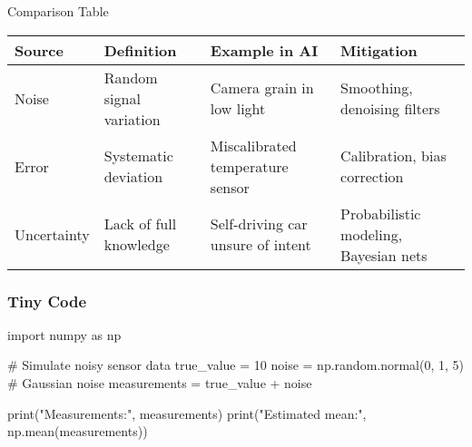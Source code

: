 \documentclass[
  letterpaper,
  DIV=11,
  numbers=noendperiod]{scrreprt}
\newenvironment{Shaded}{\begin{snugshade}}{\end{snugshade}}
\newcommand{\BuiltInTok}[1]{\textcolor[rgb]{0.00,0.23,0.31}{#1}}
\newcommand{\CommentTok}[1]{\textcolor[rgb]{0.37,0.37,0.37}{#1}}
\newcommand{\DecValTok}[1]{\textcolor[rgb]{0.68,0.00,0.00}{#1}}
\newcommand{\ImportTok}[1]{\textcolor[rgb]{0.00,0.46,0.62}{#1}}
\newcommand{\NormalTok}[1]{\textcolor[rgb]{0.00,0.23,0.31}{#1}}
\newcommand{\OperatorTok}[1]{\textcolor[rgb]{0.37,0.37,0.37}{#1}}
\newcommand{\StringTok}[1]{\textcolor[rgb]{0.13,0.47,0.30}{#1}}
\begin{document}
Comparison Table

\begin{longtable}[]{@{}
  >{\raggedright\arraybackslash}p{}
  >{\raggedright\arraybackslash}p{}
  >{\raggedright\arraybackslash}p{}
  >{\raggedright\arraybackslash}p{}@{}}
\toprule\noalign{}
\begin{minipage}[b]{\linewidth}\raggedright
Source
\end{minipage} & \begin{minipage}[b]{\linewidth}\raggedright
Definition
\end{minipage} & \begin{minipage}[b]{\linewidth}\raggedright
Example in AI
\end{minipage} & \begin{minipage}[b]{\linewidth}\raggedright
Mitigation
\end{minipage} \\
\midrule\noalign{}
\endhead
\bottomrule\noalign{}
\endlastfoot
Noise & Random signal variation & Camera grain in low light & Smoothing,
denoising filters \\
Error & Systematic deviation & Miscalibrated temperature sensor &
Calibration, bias correction \\
Uncertainty & Lack of full knowledge & Self-driving car unsure of intent
& Probabilistic modeling, Bayesian nets \\
\end{longtable}

\subsubsection{Tiny Code}\label{tiny-code-25}

\begin{Shaded}
\begin{Highlighting}[]
\ImportTok{import}\NormalTok{ numpy }\ImportTok{as}\NormalTok{ np}

\CommentTok{\# Simulate noisy sensor data}
\NormalTok{true\_value }\OperatorTok{=} \DecValTok{10}
\NormalTok{noise }\OperatorTok{=}\NormalTok{ np.random.normal(}\DecValTok{0}\NormalTok{, }\DecValTok{1}\NormalTok{, }\DecValTok{5}\NormalTok{)  }\CommentTok{\# Gaussian noise}
\NormalTok{measurements }\OperatorTok{=}\NormalTok{ true\_value }\OperatorTok{+}\NormalTok{ noise}

\BuiltInTok{print}\NormalTok{(}\StringTok{"Measurements:"}\NormalTok{, measurements)}
\BuiltInTok{print}\NormalTok{(}\StringTok{"Estimated mean:"}\NormalTok{, np.mean(measurements))}
\end{Highlighting}
\end{Shaded}
\end{document}
